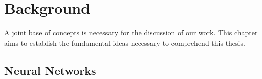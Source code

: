 \chapter{Background}
\label{ch:background}

A joint base of concepts is necessary for the discussion of our work. This chapter aims to establish the fundamental ideas necessary to comprehend this thesis.

\section{Neural Networks}

